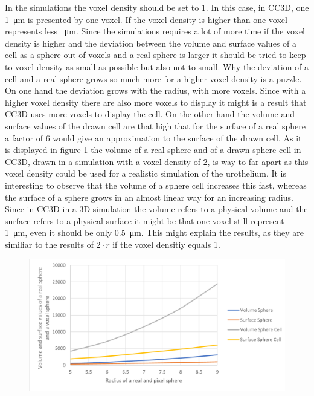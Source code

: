 In the simulations the voxel density should be set to 1. In this case, in \ac{CC3D}, one \SI{1}{\micro\metre} is presented by one voxel. If the voxel density is higher than one voxel represents less \SI{}{\micro\metre}. Since the simulations requires a lot of more time if the voxel density is higher and the deviation between the volume and surface values of a cell as a sphere out of voxels and a real sphere is larger it should be tried to keep to voxel density as small as possible but also not to small. Why the deviation of a cell and a real sphere grows so much more for a higher voxel density is a puzzle. On one hand the deviation grows with the radius, with more voxels. Since with a higher voxel density there are also more voxels to display it might is a result that \ac{CC3D} uses more voxels to display the cell. On the other hand the volume and surface values of the drawn cell are that high that for the surface of a real sphere a factor of 6 would give an approximation to the surface of the drawn cell. \newline
As it is displayed in figure \ref{img:DeviationSphereCellRealSphere-vD2} the volume of a real sphere and of a drawn sphere cell in \ac{CC3D}, drawn in a simulation with a voxel density of 2, is way to far apart as this voxel density could be used for a realistic simulation of the urothelium. It is interesting to observe that the volume of a sphere cell increases this fast, whereas the surface of a sphere grows in an almost linear way for an increasing radius. Since in \ac{CC3D} in a 3D simulation the volume refers to a physical volume and the surface refers to a physical surface it might be that one voxel still represent \SI{1}{\micro\metre}, even it should be only \SI{0.5}{\micro\metre}. This might explain the results, as they are similiar to the results of $2 \cdot r$ if the voxel densitiy equals 1.
\begin{figure}
	\center
	\includegraphics[scale=0.3]{figures/DeviationSphereToPixelSphere-vD2.png}
	\caption{}
	\label{img:DeviationSphereCellRealSphere-vD2}
\end{figure}


